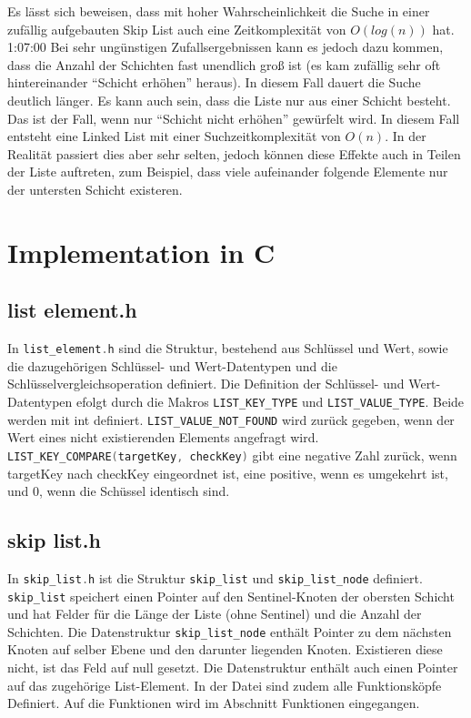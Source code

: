 \documentclass{TUBAFarbeiten}
\newcommand{\lstin}[1]{\lstinline[language=C]{#1}}
\begin{document}
Es lässt sich beweisen, dass mit hoher Wahrscheinlichkeit die Suche in einer zufällig aufgebauten Skip List auch eine Zeitkomplexität von \(O(log(n))\) hat. \cite{mitocw}1:07:00
Bei sehr ungünstigen Zufallsergebnissen kann es jedoch dazu kommen, dass die Anzahl der Schichten fast unendlich groß ist (es kam zufällig sehr oft hintereinander "`Schicht erhöhen"' heraus). In diesem Fall dauert die Suche deutlich länger. Es kann auch sein, dass die Liste nur aus einer Schicht besteht. Das ist der Fall, wenn  nur "`Schicht nicht erhöhen"' gewürfelt wird. In diesem Fall entsteht eine Linked List mit einer Suchzeitkomplexität von \(O(n)\). In der Realität passiert dies aber sehr selten, jedoch können diese Effekte auch in Teilen der Liste auftreten, zum Beispiel, dass viele aufeinander folgende Elemente nur der untersten Schicht existeren.

\section{Implementation in C}

\subsection{list element.h}
In \lstin{list_element.h} sind die Struktur, bestehend aus Schlüssel und Wert, sowie die dazugehörigen Schlüssel- und Wert-Datentypen und die Schlüsselvergleichsoperation definiert.
Die Definition der Schlüssel- und Wert-Datentypen efolgt durch die Makros \lstin{LIST_KEY_TYPE} und \lstin{LIST_VALUE_TYPE}. Beide werden mit int definiert. \lstin{LIST_VALUE_NOT_FOUND} wird zurück gegeben, wenn der Wert eines nicht existierenden Elements angefragt wird. \\ \lstin{LIST_KEY_COMPARE(targetKey, checkKey)} gibt eine negative Zahl zurück, wenn targetKey nach checkKey eingeordnet ist, eine positive, wenn es umgekehrt ist, und 0, wenn die Schüssel identisch sind. 

\subsection{skip list.h}
In \lstin{skip_list.h} ist die Struktur \lstin{skip_list} und \lstin{skip_list_node} definiert.
\lstin{skip_list} speichert einen Pointer auf den Sentinel-Knoten der obersten Schicht und hat Felder für die Länge der Liste (ohne Sentinel) und die Anzahl der Schichten.
Die Datenstruktur \lstin{skip_list_node} enthält Pointer zu dem nächsten Knoten auf selber Ebene und den darunter liegenden Knoten. Existieren diese nicht, ist das Feld auf null gesetzt. Die Datenstruktur enthält auch einen Pointer auf das zugehörige List-Element.
In der Datei sind zudem alle Funktionsköpfe Definiert. Auf die Funktionen wird im Abschnitt Funktionen eingegangen.
\end{document}
